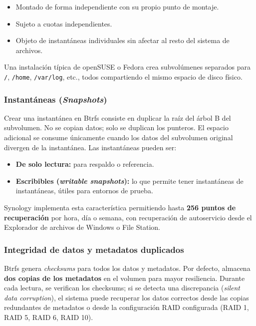 \documentclass[12pt,letterpaper]{article}
\begin{document}
\begin{itemize}
\item Montado de forma independiente con su propio punto de montaje.
\item Sujeto a cuotas independientes.
\item Objeto de instantáneas individuales sin afectar al resto del sistema de archivos.
\end{itemize}

Una instalación típica de openSUSE o Fedora crea subvolúmenes separados para
\texttt{/}, \texttt{/home}, \texttt{/var/log}, etc., todos compartiendo el mismo espacio de disco físico.

\subsubsection{Instantáneas (\emph{Snapshots})}
Crear una instantánea en Btrfs consiste en duplicar la raíz del árbol B del subvolumen. No se copian datos; solo
se duplican los punteros. El espacio adicional se consume únicamente cuando los datos del subvolumen original
divergen de la instantánea. Las instantáneas pueden ser:

\begin{itemize}
\item \textbf{De solo lectura:} para respaldo o referencia.
\item \textbf{Escribibles (\emph{writable snapshots}):} lo que permite tener instantáneas de instantáneas, útiles
  para entornos de prueba.
\end{itemize}

Synology implementa esta característica permitiendo hasta \textbf{256 puntos de recuperación} por hora, día o
semana, con recuperación de autoservicio desde el Explorador de archivos de Windows o File Station.

\subsubsection{Integridad de datos y metadatos duplicados}
Btrfs genera \emph{checksums} para todos los datos y metadatos. Por defecto, almacena
\textbf{dos copias de los metadatos} en el volumen para mayor resiliencia. Durante cada lectura, se verifican
los checksums; si se detecta una discrepancia (\emph{silent data corruption}), el sistema puede recuperar los
datos correctos desde las copias redundantes de metadatos o desde la configuración RAID configurada (RAID 1,
RAID 5, RAID 6, RAID 10).
\end{document}
